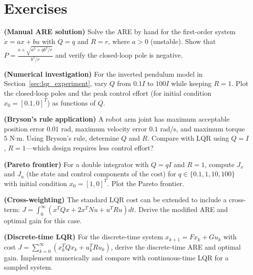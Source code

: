 \newpage
\section{Exercises}
\label{sec:lqr_exercises}

\begin{exercise}
\textbf{(Manual ARE solution)} Solve the ARE by hand for the first-order system $\dot{x} = ax + bu$ with $Q = q$ and $R = r$, where $a > 0$ (unstable). Show that $P = \frac{a + \sqrt{a^2 + qb^2/r}}{b^2/r}$ and verify the closed-loop pole is negative.
\end{exercise}

\begin{exercise}
\textbf{(Numerical investigation)} For the inverted pendulum model in Section~\ref{sec:lqr_experiment}, vary $Q$ from $0.1I$ to $100I$ while keeping $R = 1$. Plot the closed-loop poles and the peak control effort (for initial condition $x_0 = [0.1, 0]^T$) as functions of $Q$.
\end{exercise}

\begin{exercise}
\textbf{(Bryson's rule application)} A robot arm joint has maximum acceptable position error $0.01$ rad, maximum velocity error $0.1$ rad/s, and maximum torque $5$ N$\cdot$m. Using Bryson's rule, determine $Q$ and $R$. Compare with LQR using $Q = I$, $R = 1$---which design requires less control effort?
\end{exercise}

\begin{exercise}
\textbf{(Pareto frontier)} For a double integrator with $Q = qI$ and $R = 1$, compute $J_x$ and $J_u$ (the state and control components of the cost) for $q \in \{0.1, 1, 10, 100\}$ with initial condition $x_0 = [1, 0]^T$. Plot the Pareto frontier.
\end{exercise}

\begin{exercise}
\textbf{(Cross-weighting)} The standard LQR cost can be extended to include a cross-term: $J = \int_0^\infty (x^T Q x + 2x^T N u + u^T R u) dt$. Derive the modified ARE and optimal gain for this case.
\end{exercise}

\begin{exercise}
\textbf{(Discrete-time LQR)} For the discrete-time system $x_{k+1} = Fx_k + Gu_k$ with cost $J = \sum_{k=0}^\infty (x_k^T Q x_k + u_k^T R u_k)$, derive the discrete-time ARE and optimal gain. Implement numerically and compare with continuous-time LQR for a sampled system.
\end{exercise}

